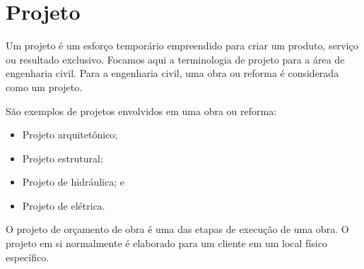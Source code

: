 \chapter{Projeto}
Um projeto é um esforço temporário empreendido para criar um produto, serviço ou resultado exclusivo. Focamos aqui a terminologia de projeto para a área de engenharia civil. Para a engenharia civil, uma obra ou reforma é considerada como um projeto.

São exemplos de projetos envolvidos em uma obra ou reforma:
\begin{itemize}
	\item Projeto arquitetônico;
	\item Projeto estrutural;
	\item Projeto de hidráulica; e
	\item Projeto de elétrica.
\end{itemize}

O projeto de orçamento de obra é uma das etapas de execução de uma obra. O projeto em si normalmente é elaborado para um cliente em um local físico específico.